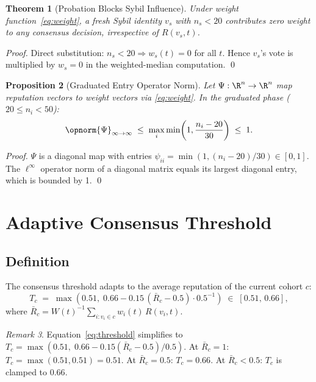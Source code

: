 \documentclass[12pt,a4paper]{article}
\newtheorem{theorem}{Theorem}[section]
\newtheorem{proposition}[theorem]{Proposition}
\theoremstyle{definition}
\theoremstyle{remark}
\newtheorem{remark}[theorem]{Remark}
\begin{document}
\begin{theorem}[Probation Blocks Sybil Influence]
\label{thm:probation}
Under weight function~\eqref{eq:weight}, a fresh Sybil identity $v_s$ with
$n_s < 20$ contributes zero weight to any consensus decision, irrespective of
$R(v_s,t)$.
\end{theorem}

\begin{proof}
Direct substitution: $n_s < 20 \Rightarrow w_s(t)=0$ for all $t$.
Hence $v_s$'s vote is multiplied by $w_s=0$ in the weighted-median computation. \qed
\end{proof}

\begin{proposition}[Graduated Entry Operator Norm]
Let $\Psi: \R^n \to \R^n$ map reputation vectors to weight vectors via
\eqref{eq:weight}.  In the graduated phase ($20 \le n_i < 50$):
\[
  \opnorm{\Psi}_{\infty\to\infty}
  \;\le\; \max_i \min\!\left(1,\frac{n_i-20}{30}\right)
  \;\le\; 1.
\]
\end{proposition}

\begin{proof}
$\Psi$ is a diagonal map with entries $\psi_{ii} = \min(1,(n_i-20)/30) \in [0,1]$.
The $\ell^\infty$ operator norm of a diagonal matrix equals its largest diagonal entry,
which is bounded by 1. \qed
\end{proof}

\section{Adaptive Consensus Threshold}
\label{sec:threshold}

\subsection{Definition}

The consensus threshold adapts to the average reputation of the current cohort $c$:
\begin{equation}
  T_c
  \;=\; \max\!\left(0.51,\; 0.66 - 0.15\,(\bar{R}_c - 0.5) \cdot 0.5^{-1}\right)
  \;\in\; [0.51,\, 0.66],
  \label{eq:threshold}
\end{equation}
where $\bar{R}_c = W(t)^{-1}\sum_{i:v_i\in c} w_i(t)\,R(v_i,t)$.

\begin{remark}
Equation~\eqref{eq:threshold} simplifies to
$T_c = \max(0.51,\; 0.66 - 0.15(\bar{R}_c - 0.5)/0.5)$.
At $\bar{R}_c=1$: $T_c=\max(0.51,0.51)=0.51$.
At $\bar{R}_c=0.5$: $T_c=0.66$.
At $\bar{R}_c<0.5$: $T_c$ is clamped to $0.66$.
\end{remark}
\end{document}
